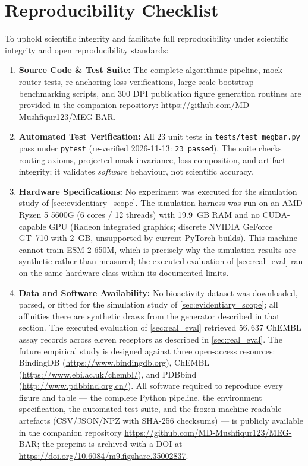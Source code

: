 \documentclass{article}
\theoremstyle{definition}
\begin{document}
\section{Reproducibility Checklist}
\label{sec:reproducibility}

To uphold scientific integrity and facilitate full reproducibility under scientific integrity and open reproducibility standards:
\begin{enumerate}[leftmargin=1.5em,noitemsep]
    \item \textbf{Source Code \& Test Suite:} The complete algorithmic pipeline, mock router tests, re-anchoring loss verifications, large-scale bootstrap benchmarking scripts, and 300 DPI publication figure generation routines are provided in the companion repository: \url{https://github.com/MD-Mushfiqur123/MEG-BAR}.
    \item \textbf{Automated Test Verification:} All $23$ unit tests in \texttt{tests/test\_megbar.py} pass under \texttt{pytest} (re-verified 2026-11-13: \texttt{23 passed}). The suite checks routing axioms, projected-mask invariance, loss composition, and artifact integrity; it validates \emph{software} behaviour, not scientific accuracy.
    \item \textbf{Hardware Specifications:} No experiment was executed for the simulation study of \cref{sec:evidentiary_scope}. The simulation harness was run on an AMD Ryzen 5 5600G (6 cores / 12 threads) with 19.9~GB RAM and no CUDA-capable GPU (Radeon integrated graphics; discrete NVIDIA GeForce GT~710 with 2~GB, unsupported by current PyTorch builds). This machine cannot train ESM-2 650M, which is precisely why the simulation results are synthetic rather than measured; the executed evaluation of \cref{sec:real_eval} ran on the same hardware class within its documented limits.
    \item \textbf{Data and Software Availability:} No bioactivity dataset was downloaded, parsed, or fitted for the simulation study of \cref{sec:evidentiary_scope}; all affinities there are synthetic draws from the generator described in that section. The executed evaluation of \cref{sec:real_eval} retrieved $56{,}637$ ChEMBL assay records across eleven receptors as described in \cref{sec:real_eval}. The future empirical study is designed against three open-access resources: BindingDB (\url{https://www.bindingdb.org}), ChEMBL (\url{https://www.ebi.ac.uk/chembl/}), and PDBbind (\url{http://www.pdbbind.org.cn/}). All software required to reproduce every figure and table --- the complete Python pipeline, the environment specification, the automated test suite, and the frozen machine-readable artefacts (CSV/JSON/NPZ with SHA-256 checksums) --- is publicly available in the companion repository \url{https://github.com/MD-Mushfiqur123/MEG-BAR}; the preprint is archived with a DOI at \url{https://doi.org/10.6084/m9.figshare.35002837}.
\end{enumerate}
\end{document}
